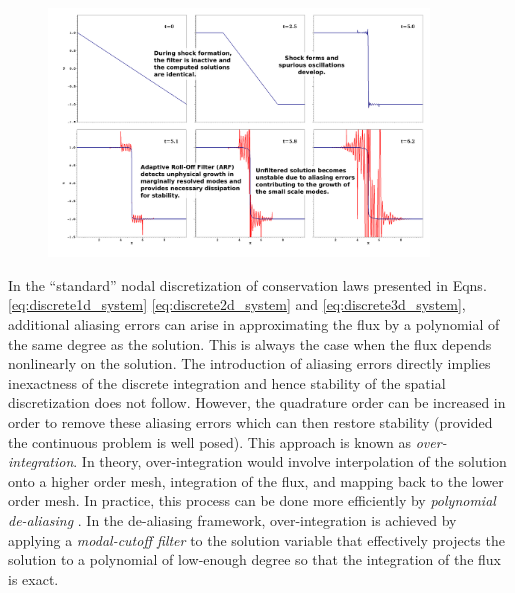 \documentclass[12pt]{softwaremanual}
\begin{document}
\begin{figure}
\begin{center}
\includegraphics[width=0.9\textwidth]{../figures/filters/burger1d-ARF15h10l/Comic-FilterDemo.png}
\caption{}\label{fig:shockFormation}
\end{center}
\end{figure}

In the ``standard'' nodal discretization of conservation laws presented in Eqns. \eqref{eq:discrete1d_system} \eqref{eq:discrete2d_system} and \eqref{eq:discrete3d_system}, additional aliasing errors can arise in approximating the flux by a polynomial of the same degree as the solution. This is always the case when the flux depends nonlinearly on the solution. The introduction of aliasing errors directly implies inexactness of the discrete integration and hence stability of the spatial discretization does not follow. However, the quadrature order can be increased in order to remove these aliasing errors which can then restore stability (provided the continuous problem is well posed). This approach is known as \textit{over-integration}. In theory, over-integration would involve interpolation of the solution onto a higher order mesh, integration of the flux, and mapping back to the lower order mesh. In practice, this process can be done more efficiently by \textit{polynomial de-aliasing} \citep{Gassner2013,Flad2016}. In the de-aliasing framework, over-integration is achieved by applying a \textit{modal-cutoff filter} to the solution variable that effectively projects the solution to a polynomial of low-enough degree so that the integration of the flux is exact.
\end{document}

